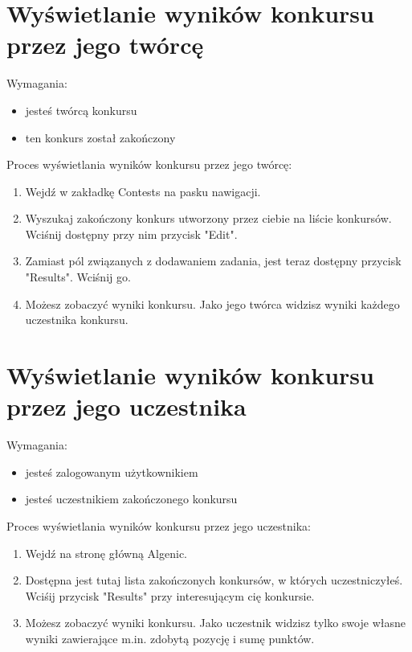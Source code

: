\documentclass{article}
\begin{document}
\section{Wyświetlanie wyników konkursu przez jego twórcę}
Wymagania:
\begin{itemize}
	\item jesteś twórcą konkursu
	\item ten konkurs został zakończony
\end{itemize}
Proces wyświetlania wyników konkursu przez jego twórcę:
\begin{enumerate}
	\item Wejdź w zakładkę Contests na pasku nawigacji.
	\item Wyszukaj zakończony konkurs utworzony przez ciebie na liście konkursów. Wciśnij dostępny przy nim przycisk "Edit".
	\item Zamiast pól związanych z dodawaniem zadania, jest teraz dostępny przycisk "Results". Wciśnij go.
	\item Możesz zobaczyć wyniki konkursu. Jako jego twórca widzisz wyniki każdego uczestnika konkursu.
\end{enumerate}

\section{Wyświetlanie wyników konkursu przez jego uczestnika}
Wymagania:
\begin{itemize}
	\item jesteś zalogowanym użytkownikiem
	\item jesteś uczestnikiem zakończonego konkursu
\end{itemize}
Proces wyświetlania wyników konkursu przez jego uczestnika:
\begin{enumerate}
	\item Wejdź na stronę główną Algenic.
	\item Dostępna jest tutaj lista zakończonych konkursów, w których uczestniczyłeś. Wciśij przycisk "Results" przy interesującym cię konkursie.
	\item Możesz zobaczyć wyniki konkursu. Jako uczestnik widzisz tylko swoje własne wyniki zawierające m.in. zdobytą pozycję i sumę punktów.
\end{enumerate}
\end{document}
